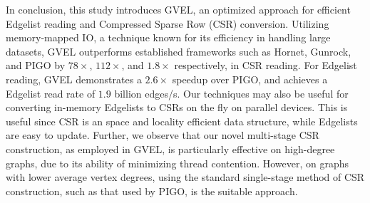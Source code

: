 In conclusion, this study introduces GVEL, an optimized approach for efficient Edgelist reading and Compressed Sparse Row (CSR) conversion. Utilizing memory-mapped IO, a technique known for its efficiency in handling large datasets, GVEL outperforms established frameworks such as Hornet, Gunrock, and PIGO by $78\times$, $112\times$, and $1.8\times$ respectively, in CSR reading. For Edgelist reading, GVEL demonstrates a $2.6\times$ speedup over PIGO, and achieves a Edgelist read rate of $1.9$ billion edges/s. Our techniques may also be useful for converting in-memory Edgelists to CSRs on the fly on parallel devices. This is useful since CSR is an space and locality efficient data structure, while Edgelists are easy to update. Further, we observe that our novel multi-stage CSR construction, as employed in GVEL, is particularly effective on high-degree graphs, due to its ability of minimizing thread contention. However, on graphs with lower average vertex degrees, using the standard single-stage method of CSR construction, such as that used by PIGO, is the suitable approach.

